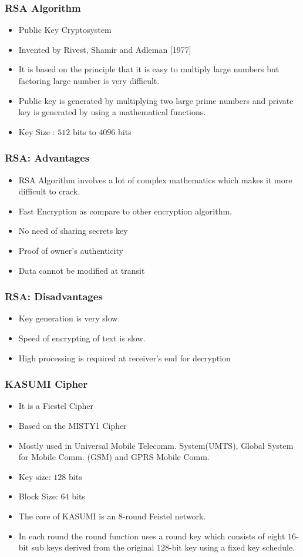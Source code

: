 \documentclass{beamer}
\begin{document}
\begin{frame}[t]
	\frametitle{RSA Algorithm}
	 \begin{itemize}
	 	\item Public Key Cryptosystem
	 	\item Invented by Rivest, Shamir and Adleman [1977]
	 	\item It is based on the principle that it is easy to multiply large numbers but factoring large number is very difficult.
	 	\item Public key is generated by multiplying two large prime numbers and private key is generated by using a mathematical functions.
	 	\item Key Size : $512$ bits to $4096$ bits
	 	 
	 \end{itemize}
\end{frame}

\begin{frame}[t]
	\frametitle{RSA: Advantages}
	\begin{itemize}
		\item RSA Algorithm involves a lot of complex mathematics which makes it more difficult to crack.
		\item Fast Encryption as compare to other encryption algorithm.
		\item No need of sharing secrets key
		\item Proof of owner's authenticity
		\item Data cannot be modified at transit
	\end{itemize}
\end{frame}
\begin{frame}[t]
	\frametitle{RSA: Disadvantages}
	\begin{itemize}
	\item Key generation is very slow.
	\item Speed of encrypting of text is slow. 
	\item High processing is required at receiver’s end for decryption
	\end{itemize}
\end{frame}

\begin{frame}[t]
	\frametitle{KASUMI Cipher}
	\begin{itemize}
		\item It is a Fiestel Cipher
		\item Based on the MISTY1 Cipher
		\item Mostly used in Universal Mobile Telecomm. System(UMTS), Global System for Mobile Comm. (GSM) and GPRS Mobile Comm.
 		\item Key size: $128$ bits
 		\item Block Size: $64$ bits
 		\item The core of KASUMI is an $8$-round Feistel network.
 		\item In each round the round function uses a round key which consists of eight $16$-bit sub keys derived from the original $128$-bit key using a fixed key schedule.
	\end{itemize}

\end{frame}
\end{document}
